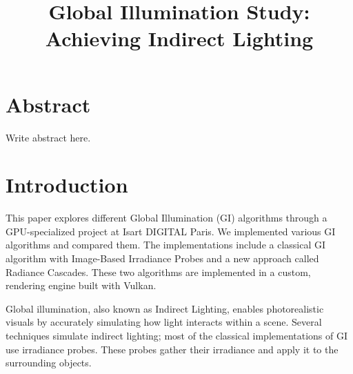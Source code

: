 \documentclass{rapportCS}
\title{Global Illumination Study: Achieving Indirect Lighting}
\begin{document}







        
\fairemarges %

\fairepagedegarde %


\section*{Abstract}

Write abstract here.


\newpage



\contents %



\newpage

\section{Introduction} 

This paper explores different Global Illumination (GI) algorithms through a GPU-specialized project at Isart DIGITAL Paris. We implemented various GI algorithms and compared them. The implementations include a classical GI algorithm with Image-Based Irradiance Probes and a new approach called Radiance Cascades. These two algorithms are implemented in a custom, rendering engine built with Vulkan.

Global illumination, also known as Indirect Lighting, enables photorealistic visuals by accurately simulating how light interacts within a scene. Several techniques simulate indirect lighting; most of the classical implementations of GI use irradiance probes. These probes gather their irradiance and apply it to the surrounding objects.
    
\end{document}
